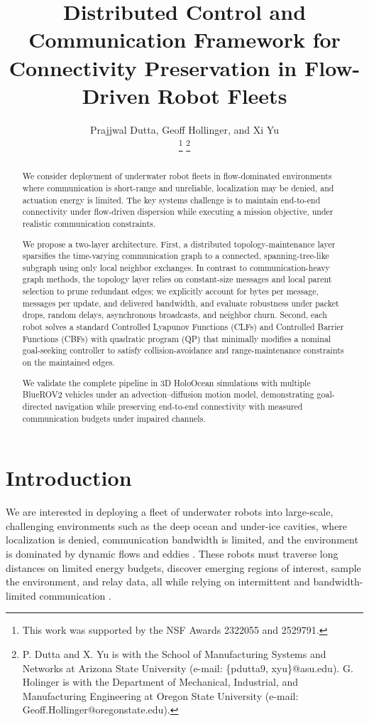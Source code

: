 \documentclass[conference]{IEEEconf}
\title{\LARGE \bf
Distributed Control and Communication Framework for Connectivity Preservation in Flow-Driven Robot Fleets}
\author{Prajjwal Dutta, Geoff Hollinger, and Xi Yu\\
 \thanks{This work was supported by the NSF Awards 2322055 and 2529791.}
 \thanks{P. Dutta and X. Yu is with the School of Manufacturing Systems and Networks at Arizona State University (e-mail: \{pdutta9, xyu\}@asu.edu).
 G. Holinger is with the Department of Mechanical, Industrial, and Manufacturing Engineering at Oregon State University (e-mail: Geoff.Hollinger@oregonstate.edu).
}
 }
\theoremstyle{plain}
\begin{document}
\maketitle

\begin{abstract}
We consider deployment of underwater robot fleets in flow-dominated environments where communication is short-range and unreliable, localization may be denied, and actuation energy is limited. The key systems challenge is to maintain end-to-end connectivity under flow-driven dispersion while executing a mission objective, under realistic communication constraints.

We propose a two-layer architecture. First, a distributed topology-maintenance layer sparsifies the time-varying communication graph to a connected, spanning-tree-like subgraph using only local neighbor exchanges. In contrast to communication-heavy graph methods, the topology layer relies on constant-size messages and local parent selection to prune redundant edges; we explicitly account for bytes per message, messages per update, and delivered bandwidth, and evaluate robustness under packet drops, random delays, asynchronous broadcasts, and neighbor churn. Second, each robot solves a standard Controlled Lyapunov Functions (CLFs) and Controlled Barrier Functions (CBFs) with quadratic program (QP) that minimally modifies a nominal goal-seeking controller to satisfy collision-avoidance and range-maintenance constraints on the maintained edges.

We validate the complete pipeline in 3D HoloOcean simulations with multiple BlueROV2 vehicles under an advection--diffusion motion model, demonstrating goal-directed navigation while preserving end-to-end connectivity with measured communication budgets under impaired channels.
\end{abstract}

\section{Introduction}\label{sec:intro}

We are interested in deploying a fleet of underwater robots into large-scale, challenging environments such as the deep ocean and under-ice cavities, where localization is denied, communication bandwidth is limited, and the environment is dominated by dynamic flows and eddies \cite{muto2024}. 
These robots must traverse long distances on limited energy budgets, discover emerging regions of interest, sample the environment, and relay data, all while relying on intermittent and bandwidth-limited communication \cite{schiel2024chirps, schiel2024role}.
\end{document}
